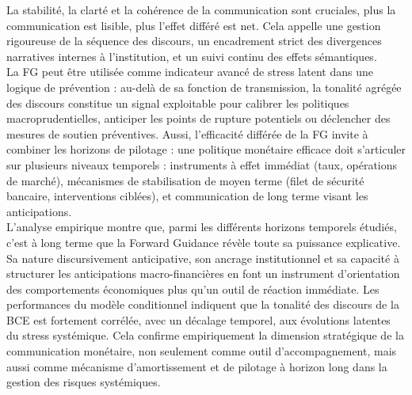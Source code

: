 La stabilité, la clarté et la cohérence de la communication sont cruciales, plus la communication est lisible, plus l’effet différé est net. Cela appelle une gestion rigoureuse de la séquence des discours, un encadrement strict des divergences narratives internes à l’institution, et un suivi continu des effets sémantiques.\\

La FG peut être utilisée comme indicateur avancé de stress latent dans une logique de prévention : au-delà de sa fonction de transmission, la tonalité agrégée des discours constitue un signal exploitable pour calibrer les politiques macroprudentielles, anticiper les points de rupture potentiels ou déclencher des mesures de soutien préventives. Aussi, l’efficacité différée de la FG invite à combiner les horizons de pilotage : une politique monétaire efficace doit s’articuler sur plusieurs niveaux temporels : instruments à effet immédiat (taux, opérations de marché), mécanismes de stabilisation de moyen terme (filet de sécurité bancaire, interventions ciblées), et communication de long terme visant les anticipations.\\

L’analyse empirique montre que, parmi les différents horizons temporels étudiés, c’est à long terme que la Forward Guidance révèle toute sa puissance explicative. Sa nature discursivement anticipative, son ancrage institutionnel et sa capacité à structurer les anticipations macro-financières en font un instrument d’orientation des comportements économiques plus qu’un outil de réaction immédiate. Les performances du modèle conditionnel indiquent que la tonalité des discours de la BCE est fortement corrélée, avec un décalage temporel, aux évolutions latentes du stress systémique. Cela confirme empiriquement la dimension stratégique de la communication monétaire, non seulement comme outil d’accompagnement, mais aussi comme mécanisme d’amortissement et de pilotage à horizon long dans la gestion des risques systémiques.\\

